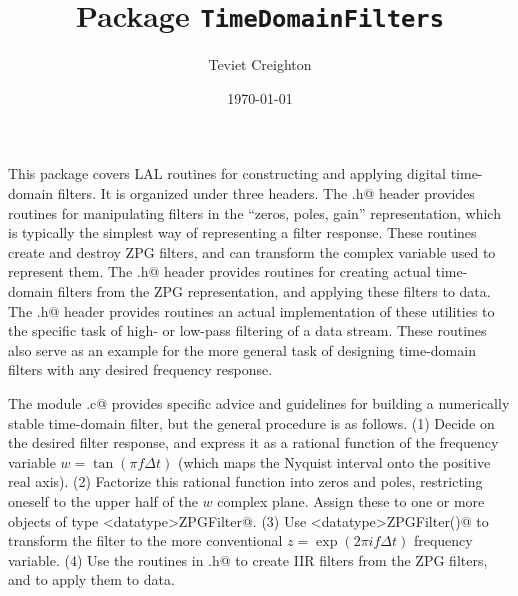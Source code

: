 \documentclass{article}
\begin{document}
\title{Package \texttt{TimeDomainFilters}}
\author{Teviet Creighton}
\date{\today}
\maketitle

This package covers LAL routines for constructing and applying digital
time-domain filters.  It is organized under three headers.  The
\verb@ZPGFilter.h@ header provides routines for manipulating filters
in the ``zeros, poles, gain'' representation, which is typically the
simplest way of representing a filter response.  These routines create
and destroy ZPG filters, and can transform the complex variable used
to represent them.  The \verb@IIRFilter.h@ header provides routines
for creating actual time-domain filters from the ZPG representation,
and applying these filters to data.  The \verb@BandPassTimeSeries.h@
header provides routines an actual implementation of these utilities
to the specific task of high- or low-pass filtering of a data stream.
These routines also serve as an example for the more general task of
designing time-domain filters with any desired frequency response.

The module \verb@ButterworthTimeSeries.c@ provides specific advice and
guidelines for building a numerically stable time-domain filter, but
the general procedure is as follows.  (1) Decide on the desired filter
response, and express it as a rational function of the frequency
variable $w=\tan(\pi f\Delta t)$ (which maps the Nyquist interval onto
the positive real axis).  (2) Factorize this rational function into
zeros and poles, restricting oneself to the upper half of the $w$
complex plane.  Assign these to one or more objects of type
\verb@<datatype>ZPGFilter@.  (3) Use \verb@WToZ<datatype>ZPGFilter()@
to transform the filter to the more conventional $z=\exp(2\pi if\Delta
t)$ frequency variable.  (4) Use the routines in \verb@IIRFilter.h@ to
create IIR filters from the ZPG filters, and to apply them to data.




\end{document}

